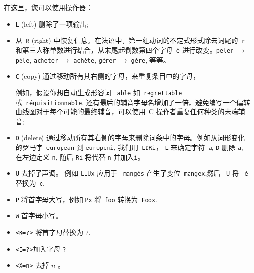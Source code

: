 在这里，您可以使用操作器：


\begin{itemize}
\item \verb+L+ (left) 删除了一项输出;
  	  
\item 从\ \verb+R+ (right) 中恢复信息。在法语中，第一组动词的不定式形式除去词尾的\ \verb+r+ 和第三人称单数进行结合，从末尾起倒数第四个字母\ \texttt{è} 进行改变。\verb+peler+ $\rightarrow$ \texttt{pèle},
  	  \verb+acheter+ $\rightarrow$ \texttt{achète}, \texttt{gérer}
  	  $\rightarrow$ \texttt{gère}, 等等。

  	  
\item \verb+C+ (copy) 通过移动所有其右侧的字母，来重复条目中的字母，
  	  
例如，假设你想自动生成形容词
\ \verb+able+ 如\ \verb+regrettable+ 或\ \verb+réquisitionnable+,
 还有最后的辅音字母名增加了一倍。避免编写一个偏转曲线图对于每个可能的最终辅音，可以使用\ C 操作者重复任何种类的末端辅音;
  
  \item \verb+D+ (delete) 通过移动所有其右侧的字母来删除词条中的字母。例如从词形变化的罗马字\  \verb+european+ 到 \verb+europeni+, 我们用\ \verb+LDRi+，  \verb+L+ 来确定字符\ \verb+a+, \verb+D+ 删除 \verb+a+, 在左边定义 \verb+n+, 随后 \verb+Ri+ 将代替 \verb+n+ 并加入\verb+i+。

\item \verb+U+ 去掉了声调。
	例如 \verb+LLUx+ 应用于
\ \texttt{mangés} 产生了变位\ \verb+mangex+,然后 \ \verb+U+
	将 \ \texttt{é} 替换为\  \verb+e+.

\item \verb+P+ 将首字母大写，例如
	\verb$Px$ 将\ \verb$foo$ 转换为\ \verb$Foox$.
  
\item \verb+W+ 首字母小写。

\item \verb+<R=?>+ 将首字母替换为 \verb+?+.

\item \verb+<I=?>+加入字母 \verb+?+

\item \verb+<X=n>+ 去掉 $n$ 。
\end{itemize}


